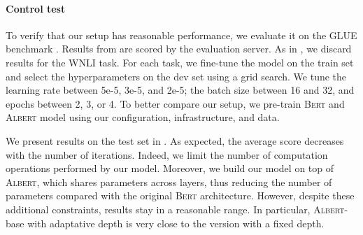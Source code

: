\paragraph{Control test} To verify that our setup has reasonable performance, we evaluate it on the GLUE benchmark \parencite{wang_19}.
Results from  are scored by the evaluation server. As in \textcite{devlin_19}, we discard results for the WNLI task. For each task, we fine-tune the model on the train set and select the hyperparameters on the dev set using a grid search. We tune the learning rate between 5e-5, 3e-5, and 2e-5; the batch size between 16 and 32, and epochs between 2, 3, or 4. To better compare our setup, we pre-train \textsc{Bert} and \textsc{Albert} model using our configuration, infrastructure, and data.

\begin{table}[!htb]
\small
\caption{GLUE Test results, scored by the evaluation server but without the WNLI task. To facilitate the comparison, we reproduce \textsc{Bert} and \textsc{Albert}, with our pre-training dataset, infrastructure and configuration detailed in .}
\end{table}

We present results on the test set in . As expected, the average score decreases with the number of iterations. Indeed, we limit the number of computation operations performed by our model. Moreover, we build our model on top of \textsc{Albert}, which shares parameters across layers, thus reducing the number of parameters compared with the original \textsc{Bert}  architecture. However, despite these additional constraints, results stay in a reasonable range. In particular, \textsc{Albert}-base with adaptative depth is very close to the version with a fixed depth. 

